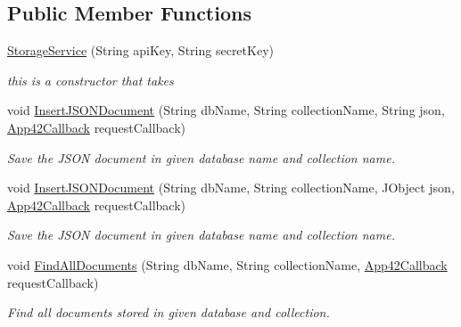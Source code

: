 \subsection*{Public Member Functions}
\begin{DoxyCompactItemize}
\item 
\hyperlink{classcom_1_1shephertz_1_1app42_1_1paas_1_1sdk_1_1windows_1_1storage_1_1_storage_service_a7db2d866e94ebbea3bd148aa2c060282}{Storage\+Service} (String api\+Key, String secret\+Key)
\begin{DoxyCompactList}\small\item\em this is a constructor that takes \end{DoxyCompactList}\item 
void \hyperlink{classcom_1_1shephertz_1_1app42_1_1paas_1_1sdk_1_1windows_1_1storage_1_1_storage_service_adb959fb3f782b35c40d7a618f31fef93}{Insert\+J\+S\+O\+N\+Document} (String db\+Name, String collection\+Name, String json, \hyperlink{interfacecom_1_1shephertz_1_1app42_1_1paas_1_1sdk_1_1windows_1_1_app42_callback}{App42\+Callback} request\+Callback)
\begin{DoxyCompactList}\small\item\em Save the J\+S\+O\+N document in given database name and collection name. \end{DoxyCompactList}\item 
void \hyperlink{classcom_1_1shephertz_1_1app42_1_1paas_1_1sdk_1_1windows_1_1storage_1_1_storage_service_af91075653180549a66516451c178e358}{Insert\+J\+S\+O\+N\+Document} (String db\+Name, String collection\+Name, J\+Object json, \hyperlink{interfacecom_1_1shephertz_1_1app42_1_1paas_1_1sdk_1_1windows_1_1_app42_callback}{App42\+Callback} request\+Callback)
\begin{DoxyCompactList}\small\item\em Save the J\+S\+O\+N document in given database name and collection name. \end{DoxyCompactList}\item 
void \hyperlink{classcom_1_1shephertz_1_1app42_1_1paas_1_1sdk_1_1windows_1_1storage_1_1_storage_service_a5f1ab7d2564be96aa38d801e0c02bab1}{Find\+All\+Documents} (String db\+Name, String collection\+Name, \hyperlink{interfacecom_1_1shephertz_1_1app42_1_1paas_1_1sdk_1_1windows_1_1_app42_callback}{App42\+Callback} request\+Callback)
\begin{DoxyCompactList}\small\item\em Find all documents stored in given database and collection. \end{DoxyCompactList}\item 

\end{DoxyCompactItemize}
